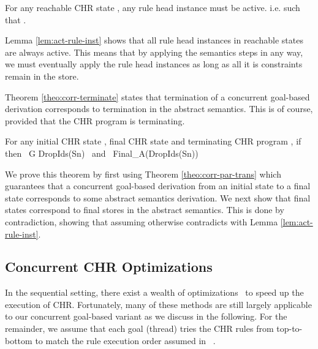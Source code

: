 \documentclass{tlp}
\begin{document}
\begin{lemma}  \label{lem:act-rule-inst}
  For any reachable CHR state , any rule head instance  must 
  be active. i.e.  such that .
\end{lemma}

Lemma \ref{lem:act-rule-inst} shows that all rule head instances in reachable states are always
active. This means that by applying the semantics steps in any way, we must eventually apply
the rule head instances as long as all it is constraints remain in the store. 

Theorem \ref{theo:corr-terminate} states that termination of a concurrent goal-based derivation
corresponds to termination in the abstract semantics. This is of course, provided that the
CHR program is terminating.

\begin{theorem}  \label{theo:corr-terminate}
   For any initial CHR state , final CHR state  and
   terminating CHR program ,
     \mbox{if }  \partransstar {} \\
     \mbox{then } G \abstransstar DropIds(Sn) \mbox{ and } Final_{\cal A}(DropIds(Sn))
   \eda
\end{theorem}

We prove this theorem by first using Theorem \ref{theo:corr-par-trans} which guarantees that
a concurrent goal-based derivation from an initial state to a final state corresponds to 
some abstract semantics derivation. We next show that final states correspond to final
stores in the abstract semantics. This is done by contradiction, showing that assuming
otherwise contradicts with Lemma \ref{lem:act-rule-inst}.

\subsection{Concurrent CHR Optimizations} \label{sec:concurrent-chr-opt}

In the sequential setting, there exist
a wealth of optimizations~\cite{greg:thesis,DBLP:conf/iclp/Schrijvers05,DBLP:conf/iclp/SneyersSD05}
to speed up the execution of CHR.
Fortunately, many of these methods are still largely applicable to our concurrent goal-based 
variant as we discuss in the following. For the remainder, we assume that each goal (thread) tries the CHR 
rules from top-to-bottom to match the rule execution order assumed in
~\cite{greg:thesis,DBLP:conf/iclp/Schrijvers05,DBLP:conf/iclp/SneyersSD05}.
\end{document}
